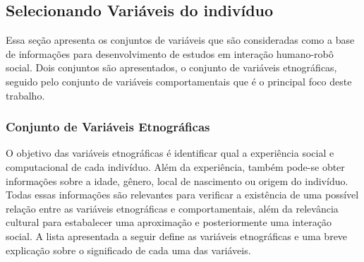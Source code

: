 \subsection{Selecionando Variáveis do indivíduo}
\label{sec:variaveisindivíduo}

Essa seção apresenta os conjuntos de variáveis que são consideradas como a base de informações para desenvolvimento de estudos em interação humano-robô social. Dois conjuntos são apresentados, o conjunto de variáveis etnográficas, seguido pelo conjunto de variáveis comportamentais que é o principal foco deste trabalho.

\subsubsection{Conjunto de Variáveis Etnográficas}
\label{sec:variaveisetnograficas}

O objetivo das variáveis etnográficas é identificar qual a experiência social e computacional de cada indivíduo. Além da experiência, também pode-se obter informações sobre a idade, gênero, local de nascimento ou origem do indivíduo. Todas essas informações são relevantes para verificar a existência de uma possível relação entre as variáveis etnográficas e comportamentais, além da relevância cultural para estabalecer uma aproximação e posteriormente uma interação social. A lista apresentada a seguir define as variáveis etnográficas e uma breve explicação sobre o significado de cada uma das variáveis.

